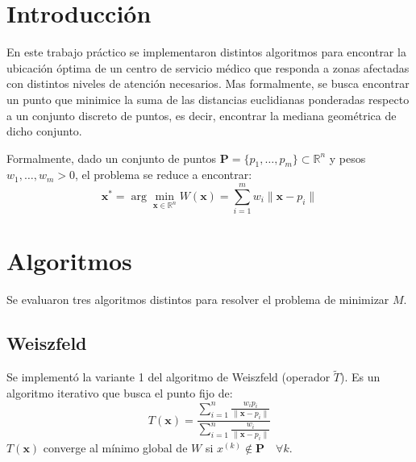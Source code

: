 \documentclass[10pt]{article}
\begin{document}

	\fecha{\today}



	\maketitle

\section{Introducción}

En este trabajo práctico se implementaron distintos algoritmos para encontrar la ubicación óptima de un centro de servicio médico que responda a zonas afectadas con distintos niveles de atención necesarios. Mas formalmente, se busca encontrar un punto que minimice la suma de las distancias euclidianas ponderadas respecto a un conjunto discreto de puntos, es decir, encontrar la mediana geométrica de dicho conjunto.

Formalmente, dado un conjunto de puntos $ \mathbf{P} = \{p_1, \dots, p_m\} \subset \mathbb{R}^n$ y pesos $w_1, \dots, w_m > 0$, el problema se reduce a encontrar:
\[
\mathbf{x}^* = \arg \min_{\mathbf{x} \in \mathbb{R}^n} W(\mathbf{x}) = \sum_{i=1}^{m} w_i \|\mathbf{x} - p_i\|
\]

\section{Algoritmos}

Se evaluaron tres algoritmos distintos para resolver el problema de minimizar $M$.

\subsection{Weiszfeld}

Se implementó la variante 1  del algoritmo de Weiszfeld (operador $\tilde{T}$). Es un algoritmo iterativo que busca el punto fijo de:
\[
T(\mathbf{x}) = \frac{ \sum_{i=1}^{n} \frac{w_i p_i}{\| \mathbf{x} - p_i \|} }{ \sum_{i=1}^{n} \frac{w_i}{\| \mathbf{x} - p_i \|} }
\]
$T(\mathbf{x})$ converge al mínimo global de $W$ si $x^{(k)} \notin \mathbf{P} \quad \forall k$.
\end{document}
